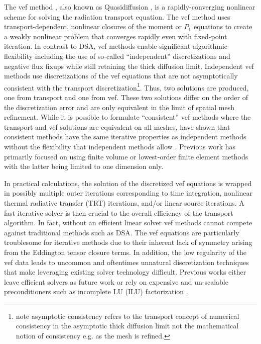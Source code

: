 \documentclass[../doc.tex]{subfiles}
\begin{document}
The \gls{vef} method \cite{mihalas}, also known as Quasidiffusion \cite{goldin}, is a rapidly-converging nonlinear scheme for solving the radiation transport equation. The \gls{vef} method uses transport-dependent, nonlinear closures of the moment or $P_1$ equations to create a weakly nonlinear problem that converges rapidly even with fixed-point iteration. In contrast to DSA, \gls{vef} methods enable significant algorithmic flexibility including the use of so-called ``independent'' discretizations \cite{two-level-independent-warsa,me,olivier_mandc} and negative flux fixups \cite{YEE2020109696} while still retaining the thick diffusion limit. Independent \gls{vef} methods use discretizations of the \gls{vef} equations that are not asymptotically consistent with the transport discretization\footnote{note asymptotic consistency refers to the transport concept of numerical consistency in the asymptotic thick diffusion limit not the mathematical notion of consistency e.g. as the mesh is refined.}. Thus, two solutions are produced, one from transport and one from \gls{vef}. These two solutions differ on the order of the discretization error and are only equivalent in the limit of spatial mesh refinement. While it is possible to formulate ``consistent'' \gls{vef} methods where the transport and \gls{vef} solutions are equivalent on all meshes, \citeauthor{two-level-independent-warsa} have shown that consistent methods have the same iterative properties as independent methods without the flexibility that independent methods allow \cite{two-level-independent-warsa}. Previous work has primarily focused on using finite volume \cite{weasel,wieselquist,Jones2019TheQM} or lowest-order finite element methods \cite{two-level-independent-warsa,ho_trt_maginot,LOU2019258} with the latter being limited to one dimension only. 

In practical calculations, the solution of the discretized \gls{vef} equations is wrapped in possibly multiple outer iterations corresponding to time integration, nonlinear thermal radiative transfer (TRT) iterations, and/or linear source iterations. A fast iterative solver is then crucial to the overall efficiency of the transport algorithm. In fact, without an efficient linear solver \gls{vef} methods cannot compete against traditional methods such as DSA. The \gls{vef} equations are particularly troublesome for iterative methods due to their inherent lack of symmetry arising from the Eddington tensor closure terms. In addition, the low regularity of the \gls{vef} data leads to uncommon and oftentimes unnatural discretization techniques that make leveraging existing solver technology difficult. Previous works either leave efficient solvers as future work \cite{two-level-independent-warsa,me,LOU2019258} or rely on expensive and un-scalable preconditioners such as incomplete LU (ILU) factorization \cite{weasel}. 
\end{document}
